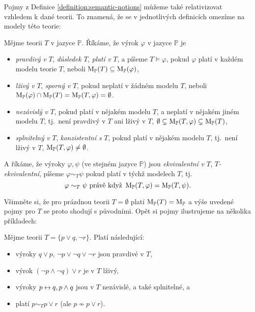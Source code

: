 Pojmy z Definice \ref{definition:semantic-notions} můžeme také relativizovat vzhledem k dané teorii. To znamená, že se v jednotlivých definicích omezíme na modely této teorie:

\begin{definition}
    Mějme teorii $T$ v jazyce $\mathbb P$. Říkáme, že výrok $\varphi$ v jazyce $\mathbb P$ je
    \begin{itemize}
        \item \emph{pravdivý v $T$}, \emph{důsledek $T$}, \emph{platí v $T$}, a píšeme $T \models \varphi$, pokud $\varphi$ platí v každém modelu teorie $T$, neboli $\operatorname{M}_\mathbb P(T)\subseteq \operatorname{M}_\mathbb P(\varphi)$,
        \item \emph{lživý v $T$}, \emph{sporný v $T$}, pokud neplatí v žádném modelu $T$, neboli $\operatorname{M}_\mathbb P(\varphi)\cap\operatorname{M}_\mathbb P(T)=\operatorname{M}_\mathbb P(T,\varphi)=\emptyset$.
        \item \emph{nezávislý v $T$}, pokud platí v nějakém modelu $T$, a neplatí v nějakém jiném modelu $T$, tj.\ není pravdivý v $T$ ani lživý v $T$, $\emptyset\subsetneq\operatorname{M}_\mathbb P(T,\varphi)\subsetneq\operatorname{M}_\mathbb P(T)$,
        \item \emph{splnitelný v $T$}, \emph{konzistentní s $T$}, pokud platí v nějakém modelu $T$, tj.\ není lživý v $T$, $\operatorname{M}_\mathbb P(T,\varphi)\neq\emptyset$.
    \end{itemize}
    A říkáme, že výroky $\varphi,\psi$ (ve stejném jazyce $\mathbb P$) jsou \emph{ekvivalentní v $T$}, \emph{$T$-ekvivalentní}, píšeme $\varphi\sim_T\psi$ pokud platí v týchž modelech $T$, tj.\
    $$
    \varphi\sim_T\psi\text{ právě když }\operatorname{M}_\mathbb P(T,\varphi)=\operatorname{M}_\mathbb P(T,\psi).
    $$
    \end{definition}

Všimněte si, že pro prázdnou teorii $T=\emptyset$ platí $\operatorname{M}_\mathbb P(T)=\operatorname{M}_\mathbb P$ a výše uvedené pojmy pro $T$ se proto shodují s původními. Opět si pojmy ilustrujeme na několika příkladech:

\begin{example} Mějme teorii $T=\{p\lor q,\neg r\}$. Platí následující:
    \begin{itemize}
        \item výroky $q\lor p$, $\neg p\lor\neg q\lor \neg r$ jsou pravdivé v $T$,
        \item výrok $(\neg p\land\neg q)\lor r$ je v $T$ lživý,
        \item výroky $p\mathbin{\leftrightarrow} q, p\land q$ jsou v $T$ nezávislé, a také splnitelné, a
        \item platí $p\sim_T p\lor r$ (ale $p\not\sim p\lor r$).
    \end{itemize}
\end{example}


